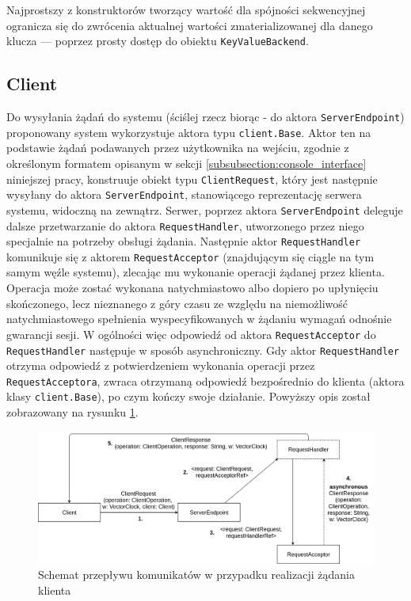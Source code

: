 Najprostszy z konstruktorów tworzący wartość dla spójności sekwencyjnej ogranicza się do zwrócenia aktualnej wartości zmaterializowanej dla danego klucza --- poprzez prosty dostęp do obiektu \texttt{KeyValueBackend}.

\subsection{Client} \label{subsection:client}

Do wysyłania żądań do systemu (ściślej rzecz biorąc - do aktora \texttt{ServerEndpoint}) proponowany system wykorzystuje aktora typu \texttt{client.Base}. Aktor ten na podstawie żądań podawanych przez użytkownika na wejściu, zgodnie z określonym formatem opisanym w sekcji \ref{subsubsection:console_interface} niniejszej pracy, konstruuje obiekt typu \texttt{ClientRequest}, który jest następnie wysyłany do aktora \texttt{ServerEndpoint}, stanowiącego reprezentację serwera systemu, widoczną na zewnątrz. Serwer, poprzez aktora \texttt{ServerEndpoint} deleguje dalsze przetwarzanie do aktora \texttt{RequestHandler}, utworzonego przez niego specjalnie na potrzeby obsługi żądania. Następnie aktor \texttt{RequestHandler} komunikuje się z aktorem \texttt{RequestAcceptor} (znajdującym się ciągle na tym samym węźle systemu), zlecając mu wykonanie operacji żądanej przez klienta. Operacja może zostać wykonana natychmiastowo albo dopiero po upłynięciu skończonego, lecz nieznanego z góry czasu ze względu na niemożliwość natychmiastowego spełnienia wyspecyfikowanych w żądaniu wymagań odnośnie gwarancji sesji. W ogólności więc odpowiedź od aktora \texttt{RequestAcceptor} do \texttt{RequestHandler} następuje w sposób asynchroniczny. Gdy aktor \texttt{RequestHandler} otrzyma odpowiedź z potwierdzeniem wykonania operacji przez \texttt{RequestAcceptora}, zwraca otrzymaną odpowiedź bezpośrednio do klienta (aktora klasy \texttt{client.Base}), po czym kończy swoje działanie. Powyższy opis został zobrazowany na rysunku \ref{figure:implementation_messages_flow}.

\begin{figure}[h!]
    \includegraphics[width=\linewidth]{images/05-messages_flow.png}
    \caption{Schemat przepływu komunikatów w przypadku realizacji żądania klienta}
    \label{figure:implementation_messages_flow}
\end{figure}

